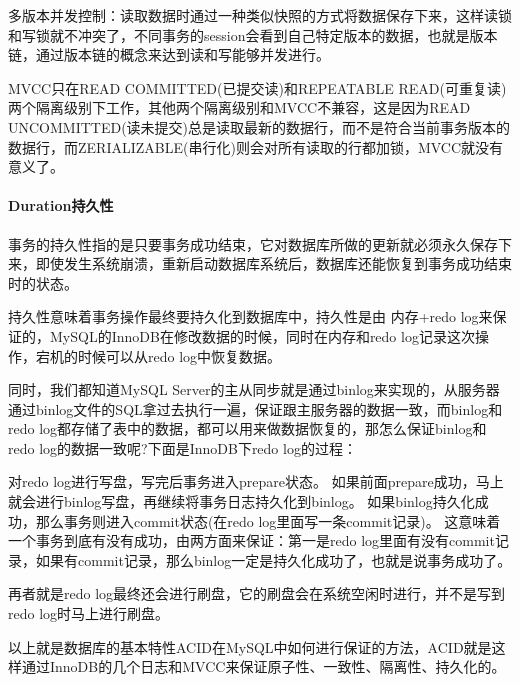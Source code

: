 \documentclass[../../../interview-questions.tex]{subfiles}
\begin{document}
多版本并发控制：读取数据时通过一种类似快照的方式将数据保存下来，这样读锁和写锁就不冲突了，不同事务的session会看到自己特定版本的数据，也就是版本链，通过版本链的概念来达到读和写能够并发进行。

MVCC只在READ COMMITTED(已提交读)和REPEATABLE READ(可重复读)两个隔离级别下工作，其他两个隔离级别和MVCC不兼容，这是因为READ UNCOMMITTED(读未提交)总是读取最新的数据行，而不是符合当前事务版本的数据行，而ZERIALIZABLE(串行化)则会对所有读取的行都加锁，MVCC就没有意义了。

\paragraph{Duration持久性}

事务的持久性指的是只要事务成功结束，它对数据库所做的更新就必须永久保存下来，即使发生系统崩溃，重新启动数据库系统后，数据库还能恢复到事务成功结束时的状态。

持久性意味着事务操作最终要持久化到数据库中，持久性是由 内存+redo log来保证的，MySQL的InnoDB在修改数据的时候，同时在内存和redo log记录这次操作，宕机的时候可以从redo log中恢复数据。

同时，我们都知道MySQL Server的主从同步就是通过binlog来实现的，从服务器通过binlog文件的SQL拿过去执行一遍，保证跟主服务器的数据一致，而binlog和redo log都存储了表中的数据，都可以用来做数据恢复的，那怎么保证binlog和redo log的数据一致呢?下面是InnoDB下redo log的过程：

对redo log进行写盘，写完后事务进入prepare状态。
如果前面prepare成功，马上就会进行binlog写盘，再继续将事务日志持久化到binlog。
如果binlog持久化成功，那么事务则进入commit状态(在redo log里面写一条commit记录)。
这意味着一个事务到底有没有成功，由两方面来保证：第一是redo log里面有没有commit记录，如果有commit记录，那么binlog一定是持久化成功了，也就是说事务成功了。

再者就是redo log最终还会进行刷盘，它的刷盘会在系统空闲时进行，并不是写到redo log时马上进行刷盘。

以上就是数据库的基本特性ACID在MySQL中如何进行保证的方法，ACID就是这样通过InnoDB的几个日志和MVCC来保证原子性、一致性、隔离性、持久化的。
\end{document}
